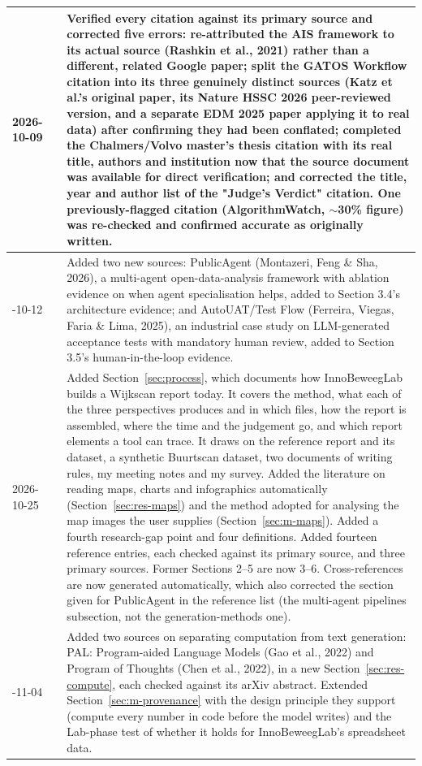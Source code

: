 \begin{longtable}{|>{\raggedright\arraybackslash}p{2.1cm}|>{\centering\arraybackslash}p{1.4cm}|>{\raggedright\arraybackslash}p{10.9cm}|}
\rowcolor{light}
2026-10-09 & 10 & Verified every citation against its primary source and corrected five errors: re-attributed the AIS framework to its actual source (Rashkin et al., 2021) rather than a different, related Google paper; split the GATOS Workflow citation into its three genuinely distinct sources (Katz et al.'s original paper, its Nature HSSC 2026 peer-reviewed version, and a separate EDM 2025 paper applying it to real data) after confirming they had been conflated; completed the Chalmers/Volvo master's thesis citation with its real title, authors and institution now that the source document was available for direct verification; and corrected the title, year and author list of the "Judge's Verdict" citation. One previously-flagged citation (AlgorithmWatch, $\sim$30\% figure) was re-checked and confirmed accurate as originally written. \\ \hline
2026-10-12 & 11 & Added two new sources: PublicAgent (Montazeri, Feng \& Sha, 2026), a multi-agent open-data-analysis framework with ablation evidence on when agent specialisation helps, added to Section 3.4's architecture evidence; and AutoUAT/Test Flow (Ferreira, Viegas, Faria \& Lima, 2025), an industrial case study on LLM-generated acceptance tests with mandatory human review, added to Section 3.5's human-in-the-loop evidence. \\ \hline
\rowcolor{light}
2026-10-25 & 12 & Added Section~\ref{sec:process}, which documents how InnoBeweegLab builds a Wijkscan report today. It covers the method, what each of the three perspectives produces and in which files, how the report is assembled, where the time and the judgement go, and which report elements a tool can trace. It draws on the reference report and its dataset, a synthetic Buurtscan dataset, two documents of writing rules, my meeting notes and my survey. Added the literature on reading maps, charts and infographics automatically (Section~\ref{sec:res-maps}) and the method adopted for analysing the map images the user supplies (Section~\ref{sec:m-maps}). Added a fourth research-gap point and four definitions. Added fourteen reference entries, each checked against its primary source, and three primary sources. Former Sections 2--5 are now 3--6. Cross-references are now generated automatically, which also corrected the section given for PublicAgent in the reference list (the multi-agent pipelines subsection, not the generation-methods one). \\ \hline
2026-11-04 & 13 & Added two sources on separating computation from text generation: PAL: Program-aided Language Models (Gao et al., 2022) and Program of Thoughts (Chen et al., 2022), in a new Section~\ref{sec:res-compute}, each checked against its arXiv abstract. Extended Section~\ref{sec:m-provenance} with the design principle they support (compute every number in code before the model writes) and the Lab-phase test of whether it holds for InnoBeweegLab's spreadsheet data. \\ \hline
\end{longtable}
\endgroup